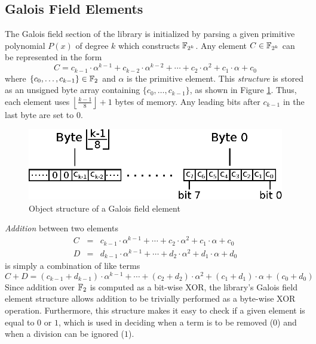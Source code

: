 \subsection{Galois Field Elements}

The Galois field section of the library is initialized by parsing a given primitive polynomial $P(x)$
of degree $k$ which constructs ${\mathbb{F}}_{2^k}$. Any element $C \in {\mathbb{F}}_{2^k}$ can be represented 
in the form 
\begin{equation}
C = c_{k-1}\cdot\alpha^{k-1}+c_{k-2}\cdot\alpha^{k-2}+\cdots+c_2\cdot\alpha^2+c_1\cdot\alpha+c_0
\end{equation}
where 
$\{c_0,\dots,c_{k-1}\}\in{\mathbb{F}}_2$ and $\alpha$ is the primitive element. This {\it structure}
is stored as an unsigned byte array containing $\{c_0,\dots,c_{k-1}\}$, 
as shown in Figure \ref{fig:gfStruct}. Thus, each element uses $\left\lfloor\frac{k-1}{8}\right\rfloor+1$ 
bytes of memory. 
Any leading bits after $c_{k-1}$ in the last byte are set to $0$.
\begin{figure}[h]
	\begin{center}
	\includegraphics[scale=1]{figures/gfElementStructure}
	\end{center}
	\caption{Object structure of a Galois field element}
	\label{fig:gfStruct}
\end{figure}

{\it Addition} between two elements
\begin{eqnarray}
C&=&c_{k-1}\cdot\alpha^{k-1}+\cdots+c_2\cdot\alpha^2+c_1\cdot\alpha+c_0 \\
D&=&d_{k-1}\cdot\alpha^{k-1}+\cdots+d_2\cdot\alpha^2+d_1\cdot\alpha+d_0
\end{eqnarray}
is simply a combination of like terms
\begin{equation}
C+D=(c_{k-1}+d_{k-1})\cdot\alpha^{k-1}+\cdots+(c_2+d_2)\cdot\alpha^2+(c_1+d_1)\cdot\alpha+(c_0+d_0)
\end{equation}
Since addition over ${\mathbb{F}}_2$ is computed as a bit-wise XOR, the library's Galois field element 
structure allows addition to be trivially performed as a byte-wise XOR operation. 
Furthermore, this structure makes it easy to check if a given element is equal 
to $0$ or $1$, which is used in deciding when a term is to be removed ($0$) and when 
a division can be ignored ($1$).

